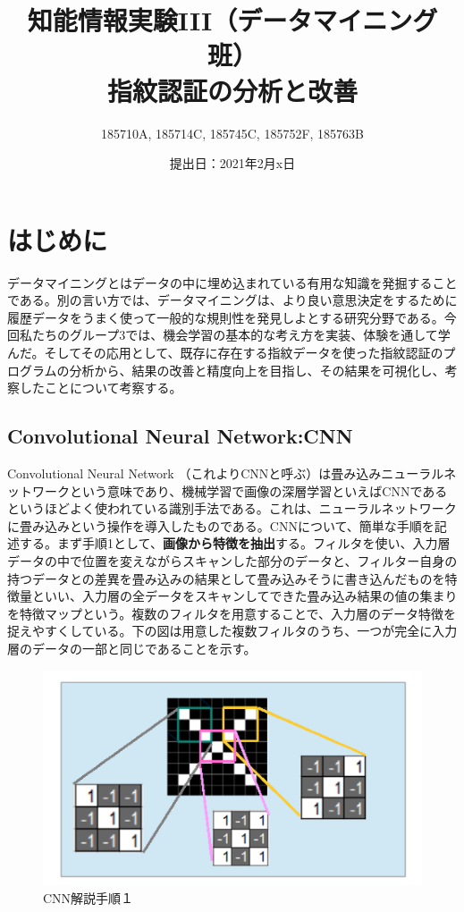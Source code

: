 \documentclass[a4paper, 11pt, titlepage]{jsarticle}
\title{知能情報実験III（データマイニング班）\\指紋認証の分析と改善}
\author{185710A, 185714C, 185745C, 185752F, 185763B}
\date{提出日：2021年2月x日}
\begin{document}
\maketitle
\tableofcontents
\clearpage


\section{はじめに}
データマイニングとはデータの中に埋め込まれている有用な知識を発掘することである。別の言い方では、データマイニングは、より良い意思決定をするために履歴データをうまく使って一般的な規則性を発見しよとする研究分野である。今回私たちのグループ3では、機会学習の基本的な考え方を実装、体験を通して学んだ。そしてその応用として、既存に存在する指紋データを使った指紋認証のプログラムの分析から、結果の改善と精度向上を目指し、その結果を可視化し、考察したことについて考察する。

\subsection{Convolutional Neural Network:CNN}
Convolutional Neural Network （これよりCNNと呼ぶ）は畳み込みニューラルネットワークという意味であり、機械学習で画像の深層学習といえばCNNであるというほどよく使われている識別手法である。これは、ニューラルネットワークに畳み込みという操作を導入したものである。CNNについて、簡単な手順を記述する。まず手順1として、\textbf{画像から特徴を抽出}する。フィルタを使い、入力層データの中で位置を変えながらスキャンした部分のデータと、フィルター自身の持つデータとの差異を畳み込みの結果として畳み込みそうに書き込んだものを特徴量といい、入力層の全データをスキャンしてできた畳み込み結果の値の集まりを特徴マップという。複数のフィルタを用意することで、入力層のデータ特徴を捉えやすくしている。下の図は用意した複数フィルタのうち、一つが完全に入力層のデータの一部と同じであることを示す。

\begin{figure}[h]
  \centering
  \includegraphics[scale=0.4]{cnn1.png}
  \caption{CNN解説手順１}
  \label{cnn}
\end{figure}
\end{document}
